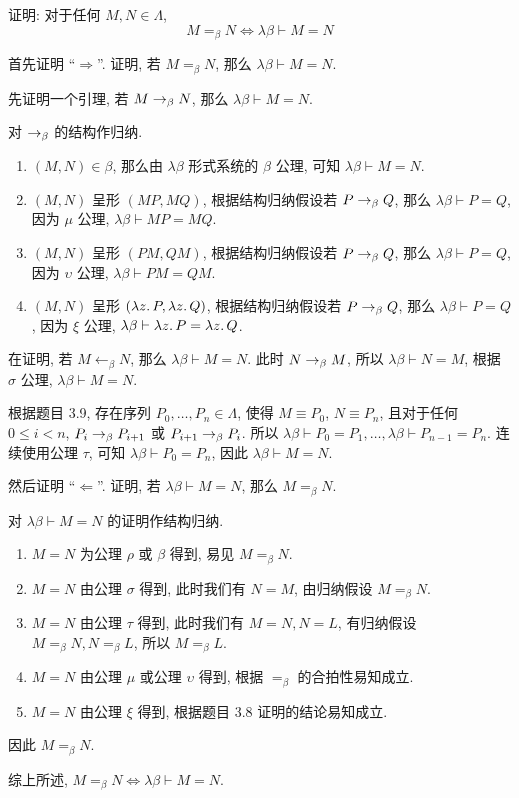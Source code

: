 \begin{problem}
证明: 对于任何 $M, N \in \Lambda$,
\[
M =_\beta N \Leftrightarrow \lambda\beta \vdash M = N
\]
\end{problem}

\begin{solution}
首先证明 ``$\Rightarrow$''. 证明, 若 $M =_\beta N$, 那么 $\lambda\beta \vdash M = N$.

先证明一个引理, 若 $M \rightarrow_\beta N$, 那么 $\lambda\beta \vdash M = N$.

对 $\rightarrow_\beta$ 的结构作归纳.
\begin{enumerate}
\item $(M, N) \in \beta$, 那么由 $\lambda\beta$ 形式系统的 $\beta$ 公理, 可知 $\lambda\beta \vdash M = N$.
\item $(M, N)$ 呈形 $(MP, MQ)$, 根据结构归纳假设若 $P \rightarrow_\beta Q$, 那么 $\lambda\beta \vdash P = Q$, 因为 $\mu$ 公理, $\lambda\beta \vdash M P = M Q$.
\item $(M, N)$ 呈形 $(PM, QM)$, 根据结构归纳假设若 $P \rightarrow_\beta Q$, 那么 $\lambda\beta \vdash P = Q$, 因为 $\upsilon$ 公理, $\lambda\beta \vdash PM = QM$.
\item $(M, N)$ 呈形 $(\lambda {z}.\,{P}, \lambda {z}.\,{Q})$, 根据结构归纳假设若 $P \rightarrow_\beta Q$, 那么 $\lambda\beta \vdash P = Q$, 因为 $\xi$ 公理, $\lambda\beta \vdash \lambda {z}.\,{P} = \lambda {z}.\,{Q}$.
\end{enumerate}
在证明, 若 $M \leftarrow_\beta N$, 那么 $\lambda\beta \vdash M = N$. 此时 $N \rightarrow_\beta M$, 所以 $\lambda\beta \vdash N = M$, 根据 $\sigma$ 公理, $\lambda\beta \vdash M = N$.

根据题目 3.9, 存在序列 $P_0, \dots, P_n \in \Lambda$, 使得 $M \equiv P_0$, $N \equiv P_n$, 且对于任何 $0 \le i < n$, $P_i \rightarrow_\beta P_{i+1}$ 或 $P_{i+1} \rightarrow_\beta P_{i}$. 所以 $\lambda\beta \vdash P_0 = P_1, \dots, \lambda\beta \vdash P_{n-1} = P_n$. 连续使用公理 $\tau$, 可知 $\lambda\beta \vdash P_0 = P_n$, 因此 $\lambda\beta \vdash M = N$.

然后证明 ``$\Leftarrow$''. 证明, 若 $\lambda\beta \vdash M = N$, 那么 $M =_\beta N$.

对 $\lambda\beta \vdash M = N$ 的证明作结构归纳.
\begin{enumerate}
\item $M = N$ 为公理 $\rho$ 或 $\beta$ 得到, 易见 $M =_\beta N$.
\item $M = N$ 由公理 $\sigma$ 得到, 此时我们有 $N = M$, 由归纳假设 $M =_\beta N$.
\item $M = N$ 由公理 $\tau$ 得到, 此时我们有 $M = N, N = L$, 有归纳假设 $M =_\beta N, N =_\beta L$, 所以 $M =_\beta L$.
\item $M = N$ 由公理 $\mu$ 或公理 $\upsilon$ 得到, 根据 $=_\beta$ 的合拍性易知成立.
\item $M = N$ 由公理 $\xi$ 得到, 根据题目 3.8 证明的结论易知成立.
\end{enumerate}

因此 $M =_\beta N$.

综上所述, $M =_\beta N \Leftrightarrow \lambda\beta \vdash M = N$.
\end{solution}
